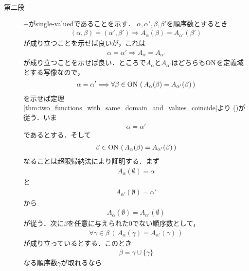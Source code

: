 \begin{sketch}
\begin{description}
			\item[第二段] $+$がsingle-valuedであることを示す．
				$\alpha,\alpha',\beta,\beta'$を順序数とするとき
				\begin{align}
					(\alpha,\beta) = (\alpha',\beta') \Longrightarrow A_\alpha(\beta) = A_{\alpha'}(\beta')
				\end{align}
				が成り立つことを示せば良いが，これは
				\begin{align}
					\alpha  = \alpha' \Longrightarrow A_\alpha = A_{\alpha'}
					\label{form:thm_summation_on_ordinal_numbers_is_a_mapping_1}
				\end{align}
				が成り立つことを示せば良い．ところで$A_\alpha$と$A_{\alpha'}$はどちらも$\mathrm{ON}$を定義域とする写像なので，
				\begin{align}
					\alpha  = \alpha' \Longrightarrow 
					\forall \beta \in \mathrm{ON}\, \left(\, A_\alpha(\beta) = A_{\alpha'}(\beta)\, \right)
				\end{align}
				を示せば定理\ref{thm:two_functions_with_same_domain_and_values_coincide}より
				()が従う．いま
				\begin{align}
					\alpha = \alpha'
				\end{align}
				であるとする．そして
				\begin{align}
					\beta \in \mathrm{ON}\, \left(\, A_\alpha(\beta) = A_{\alpha'}(\beta)\, \right)
					\label{form:thm_summation_on_ordinal_numbers_is_a_mapping_2}
				\end{align}
				なることは超限帰納法により証明する．まず
				\begin{align}
					A_\alpha(\emptyset) = \alpha
				\end{align}
				と
				\begin{align}
					A_{\alpha'}(\emptyset) = \alpha'
				\end{align}
				から
				\begin{align}
					A_\alpha(\emptyset) = A_{\alpha'}(\emptyset)
				\end{align}
				が従う．次に$\beta$を任意に与えられた$0$でない順序数として，
				\begin{align}
					\forall \gamma \in \beta\, \left(\, A_\alpha(\gamma) = A_{\alpha'}(\gamma)\, \right)
				\end{align}
				が成り立っているとする．このとき
				\begin{align}
					\beta = \gamma \cup \{\gamma\}
				\end{align}
				なる順序数$\gamma$が取れるなら
				\begin{align}

\end{align}
\end{description}
\end{sketch}
